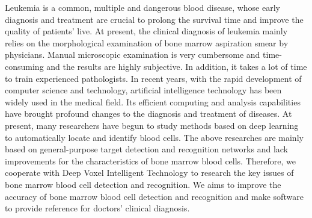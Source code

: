 \begin{abstract*}
Leukemia is a common, multiple and dangerous blood disease, whose early diagnosis and treatment are
crucial to prolong the survival time and improve the quality of patients' live. 
At present, the clinical diagnosis of leukemia mainly relies on the morphological examination of bone marrow aspiration smear by physicians.
Manual microscopic examination is very cumbersome and time-consuming and the results are highly subjective. In addition, it takes a lot of time to train experienced pathologists.
In recent years, with the rapid development of computer science and technology, artificial intelligence technology has been widely used in the medical field. Its efficient computing and analysis capabilities 
have brought profound changes to the diagnosis and treatment of diseases. 
At present, many researchers have begun to study methods based on deep learning to automatically locate and identify blood cells. 
The above researches are mainly based on general-purpose target detection and recognition networks 
and lack improvements for the characteristics of bone marrow blood cells.
Therefore, we cooperate with Deep Voxel Intelligent Technology to research the key issues of bone marrow blood cell 
detection and recognition. We aims to improve the accuracy of bone marrow blood cell detection and recognition and make software to provide reference for doctors' clinical diagnosis.


\end{abstract*}
